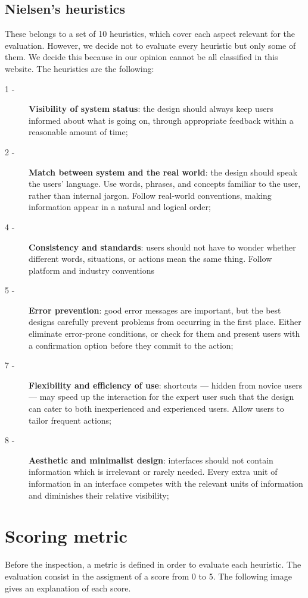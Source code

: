 \subsection{Nielsen's heuristics}
These belongs to a set of 10 heuristics, which cover each aspect relevant for the evaluation. However, we decide not to evaluate every heuristic but only some of them. We decide this because in our opinion cannot be all classified in this website.
The heuristics are the following:
\begin{description} 
\item[1 -] \textbf{Visibility of system status}: the design should always keep users informed about what is going on, through appropriate feedback within a reasonable amount of time;
\item[2 -] \textbf{Match between system and the real world}: the design should speak the users' language. Use words, phrases, and concepts familiar to the user, rather than internal jargon. Follow real-world conventions, making information appear in a natural and logical order;
\item[4 -] \textbf{Consistency and standards}: users should not have to wonder whether different words, situations, or actions mean the same thing. Follow platform and industry conventions
\item[5 -] \textbf{Error prevention}: good error messages are important, but the best designs carefully prevent problems from occurring in the first place. Either eliminate error-prone conditions, or check for them and present users with a confirmation option before they commit to the action;
\item[7 -] \textbf{Flexibility and efficiency of use}: shortcuts — hidden from novice users — may speed up the interaction for the expert user such that the design can cater to both inexperienced and experienced users. Allow users to tailor frequent actions;
\item[8 -] \textbf{Aesthetic and minimalist design}: interfaces should not contain information which is irrelevant or rarely needed. Every extra unit of information in an interface competes with the relevant units of information and diminishes their relative visibility;
\end{description}


\section{Scoring metric}
Before the inspection, a metric is defined in order to evaluate each heuristic. The evaluation consist in the assigment of a score from 0 to 5. The following image gives an explanation of each score.

